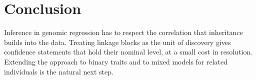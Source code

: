 \chapter{Conclusion}
\label{ch:conclusion}

Inference in genomic regression has to respect the correlation that inheritance builds into the
data. Treating linkage blocks as the unit of discovery gives confidence statements that hold
their nominal level, at a small cost in resolution. Extending the approach to binary traits and
to mixed models for related individuals is the natural next step.
